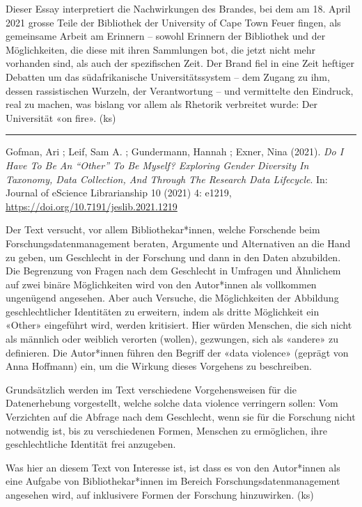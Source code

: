 \documentclass[a4paper,
fontsize=11pt,
oneside,
numbers=noperiodatend,
parskip=half-,
bibliography=totoc,
final
]{scrartcl}
\begin{document}
Dieser Essay interpretiert die Nachwirkungen des Brandes, bei dem am 18.
April 2021 grosse Teile der Bibliothek der University of Cape Town Feuer
fingen, als gemeinsame Arbeit am Erinnern -- sowohl Erinnern der
Bibliothek und der Möglichkeiten, die diese mit ihren Sammlungen bot,
die jetzt nicht mehr vorhanden sind, als auch der spezifischen Zeit. Der
Brand fiel in eine Zeit heftiger Debatten um das südafrikanische
Universitätssystem -- dem Zugang zu ihm, dessen rassistischen Wurzeln,
der Verantwortung -- und vermittelte den Eindruck, real zu machen, was
bislang vor allem als Rhetorik verbreitet wurde: Der Universität «on
fire». (ks)

\begin{center}\rule{0.5\linewidth}{0.5pt}\end{center}

Gofman, Ari ; Leif, Sam A. ; Gundermann, Hannah ; Exner, Nina (2021).
\emph{Do I Have To Be An \enquote{Other} To Be Myself? Exploring Gender
Diversity In Taxonomy, Data Collection, And Through The Research Data
Lifecycle}. In: Journal of eScience Librarianship 10 (2021) 4: e1219,
\url{https://doi.org/10.7191/jeslib.2021.1219}

Der Text versucht, vor allem Bibliothekar*innen, welche Forschende beim
Forschungsdatenmanagement beraten, Argumente und Alternativen an die
Hand zu geben, um Geschlecht in der Forschung und dann in den Daten
abzubilden. Die Begrenzung von Fragen nach dem Geschlecht in Umfragen
und Ähnlichem auf zwei binäre Möglichkeiten wird von den Autor*innen als
vollkommen ungenügend angesehen. Aber auch Versuche, die Möglichkeiten
der Abbildung geschlechtlicher Identitäten zu erweitern, indem als
dritte Möglichkeit ein «Other» eingeführt wird, werden kritisiert. Hier
würden Menschen, die sich nicht als männlich oder weiblich verorten
(wollen), gezwungen, sich als «andere» zu definieren. Die Autor*innen
führen den Begriff der «data violence» (geprägt von Anna Hoffmann) ein,
um die Wirkung dieses Vorgehens zu beschreiben.

Grundsätzlich werden im Text verschiedene Vorgehensweisen für die
Datenerhebung vorgestellt, welche solche data violence verringern
sollen: Vom Verzichten auf die Abfrage nach dem Geschlecht, wenn sie für
die Forschung nicht notwendig ist, bis zu verschiedenen Formen, Menschen
zu ermöglichen, ihre geschlechtliche Identität frei anzugeben.

Was hier an diesem Text von Interesse ist, ist dass es von den
Autor*innen als eine Aufgabe von Bibliothekar*innen im Bereich
Forschungsdatenmanagement angesehen wird, auf inklusivere Formen der
Forschung hinzuwirken. (ks)
\end{document}

